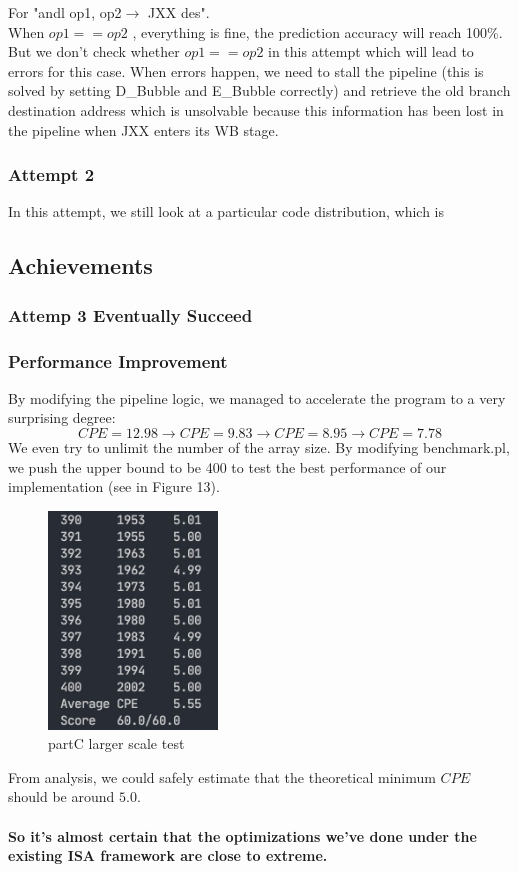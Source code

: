 \documentclass{article}
\begin{document}
For "andl op1, op2$\rightarrow$ JXX des".\\
When $op1 == op2$ , everything is fine, the prediction accuracy will reach 100\%. 
But we don't check whether $op1 == op2$ in this attempt which will lead to errors for this case.
When errors happen, we need to stall the pipeline (this is solved by setting D\_Bubble and E\_Bubble correctly) 
and retrieve the old branch destination address which is unsolvable because this information has been  
lost in the pipeline when JXX enters its WB stage.
\subsubsection{Attempt 2}
In this attempt, we still look at a particular code distribution,
which is 
\subsection{Achievements}
\subsubsection{Attemp 3 Eventually Succeed}

\subsubsection{Performance Improvement}
By modifying the pipeline logic, we managed to accelerate the program to a very surprising degree:
$$
        CPE = 12.98 \rightarrow CPE = 9.83 \rightarrow CPE = 8.95 \rightarrow CPE = 7.78
$$
We even try to unlimit the number of the array size. By modifying benchmark.pl, 
we push the upper bound to be 400 to test the best performance of our implementation (see in Figure 13).
\begin{figure}[H] %
        \centering %
        \includegraphics[width=0.4\textwidth]{partC-larger-scale-test.jpg} %
        \caption{partC larger scale test} %
        \label{Fig.partC-correctness} %
\end{figure}
From analysis, we could safely estimate that the theoretical minimum $CPE$ should be around $5.0$. \\
\\
\textbf{So it's almost certain that the optimizations we've done under the existing ISA framework are close to extreme.}
\end{document}
